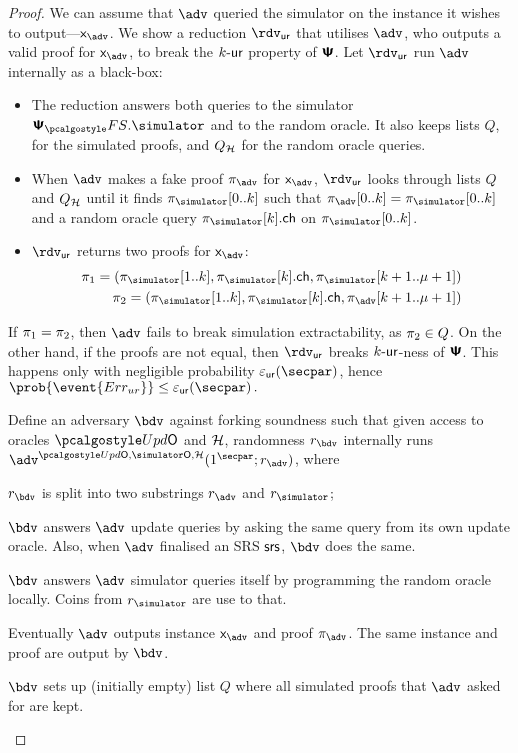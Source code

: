 \begin{proof}
{  We can assume that $\advse$ queried the simulator on the instance it wishes to
  output---$\inp_{\advse}$. We show a reduction $\rdvur$ that utilises $\advse$,
  who outputs a valid proof for $\inp_{\advse}$, to break the ${k\text{-}\mathsf{ur}}$ property of
  $\bm{\mathsf{\Psi}}$. Let $\rdvur$ run $\advse$ internally as a black-box:
\begin{itemize}
	\item The reduction answers both queries to the simulator $\psfs.\simulator$ and to the random oracle. 
	It also keeps lists $Q$, for the simulated proofs, and $Q_{\mathcal{H}}$ for the random oracle queries. 
\item When $\advse$ makes a fake proof $\zkproof_{\advse}$ for $\inp_{\advse}$,
  $\rdvur$ looks through lists $Q$ and $Q_{\mathcal{H}}$ until it finds
  $\zkproof_{\simulator}[0..k]$ such that
  $\zkproof_{\advse}[0..k] = \zkproof_{\simulator}[0..k]$
  and a random oracle query $\zkproof_{\simulator}[k].\ch$ on
  $\zkproof_{\simulator}[0..k]$.
	\item $\rdvur$ returns two proofs for $\inp_{\advse}$:
	\begin{align*}
		\zkproof_1 = (\zkproof_{\simulator}[1..k],
		\zkproof_{\simulator}[k].\ch, \zkproof_{\simulator}[k + 1..\mu + 1])\\
		\zkproof_2 = (\zkproof_{\simulator}[1..k],
		\zkproof_{\simulator}[k].\ch, \zkproof_{\advse}[k + 1..\mu + 1])
	\end{align*}
	\end{itemize}  
	If $\pi_1 = \pi_2$, then $\advse$ fails to break simulation
  extractability, as $\pi_2 \in Q$. On the other hand, if the proofs are
  not equal, then $\rdvur$ breaks ${k\text{-}\mathsf{ur}}$-ness of $\bm{\mathsf{\Psi}}$. This happens only with
  negligible probability $\epsur(\secpar)$, hence \( \prob{\event{\errur}} \leq
  \epsur(\secpar)\,. \)
}
%
		 Define an adversary $\bdv$ against forking soundness such that given access to oracles $\initU$ and $\mathcal{H}$, randomness $r_\bdv$ internally runs $\advse^{\initU, \simO, \ro} (1^\secpar; r_\adv)$, where
		\begin{compactenum}
			\item $r_\bdv$ is split into two substrings $r_\adv$ and $r_\simulator$;
			\item $\bdv$ answers $\adv$ update queries by asking the same query from its own update oracle. Also, when $\adv$ finalised an SRS $\mathsf{srs}$, $\bdv$ does the same.
			\item $\bdv$ answers $\adv$ simulator queries itself by programming the random oracle locally. Coins from $r_\simulator$ are use to that.
			\item Eventually $\adv$ outputs instance $\inp_\advse$ and  proof $\zkproof_\advse$. The same instance and proof are output by $\bdv$.
			\item $\bdv$ sets up (initially empty) list $Q$ where all simulated proofs that $\adv$ asked for are kept.
		\end{compactenum}
		

\end{proof}
